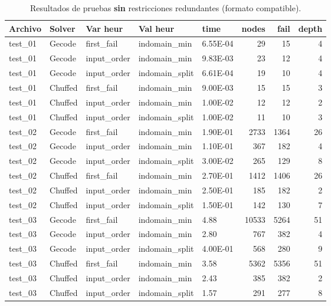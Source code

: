 \begin{compactfloats}
\begin{table}[H]
  \centering
  \small
  \setlength{\tabcolsep}{10.8pt}
  \caption{Resultados de pruebas \textbf{sin} restricciones redundantes (formato compatible).}
  \label{tab:pruebas-secuencia-off}
  \begin{tabular}{l l l l l r r r}
    \toprule
    \textbf{Archivo} & \textbf{Solver} & \textbf{Var heur} & \textbf{Val heur} & \textbf{time} & \textbf{nodes} & \textbf{fail} & \textbf{depth} \\
    \midrule
    test\_01 & Gecode  & first\_fail  & indomain\_min   & 6.55E-04 & 29   & 15  & 4 \\
    test\_01 & Gecode  & input\_order & indomain\_min   & 9.83E-03 & 23   & 12  & 4 \\
    test\_01 & Gecode  & input\_order & indomain\_split & 6.61E-04 & 19   & 10  & 4 \\
    test\_01 & Chuffed & first\_fail  & indomain\_min   & 9.00E-03 & 15   & 15  & 3 \\
    test\_01 & Chuffed & input\_order & indomain\_min   & 1.00E-02 & 12   & 12  & 2 \\
    test\_01 & Chuffed & input\_order & indomain\_split & 1.00E-02 & 11   & 10  & 3 \\
    \midrule
    test\_02 & Gecode  & first\_fail  & indomain\_min   & 1.90E-01 & 2733 & 1364 & 26 \\
    test\_02 & Gecode  & input\_order & indomain\_min   & 1.10E-01 & 367  & 182  & 4  \\
    test\_02 & Gecode  & input\_order & indomain\_split & 3.00E-02 & 265  & 129  & 8  \\
    test\_02 & Chuffed & first\_fail  & indomain\_min   & 2.70E-01 & 1412 & 1406 & 26 \\
    test\_02 & Chuffed & input\_order & indomain\_min   & 2.50E-01 & 185  & 182  & 2  \\
    test\_02 & Chuffed & input\_order & indomain\_split & 1.50E-01 & 142  & 130  & 7  \\
    \midrule
    test\_03 & Gecode  & first\_fail  & indomain\_min   & 4.88     & 10533 & 5264 & 51 \\
    test\_03 & Gecode  & input\_order & indomain\_min   & 2.80     & 767   & 382  & 4  \\
    test\_03 & Gecode  & input\_order & indomain\_split & 4.00E-01 & 568   & 280  & 9  \\
    test\_03 & Chuffed & first\_fail  & indomain\_min   & 3.58     & 5362  & 5356 & 51 \\
    test\_03 & Chuffed & input\_order & indomain\_min   & 2.43     & 385   & 382  & 2  \\
    test\_03 & Chuffed & input\_order & indomain\_split & 1.57     & 291   & 277  & 8  \\
    \bottomrule
  \end{tabular}
\end{table}

\end{compactfloats}